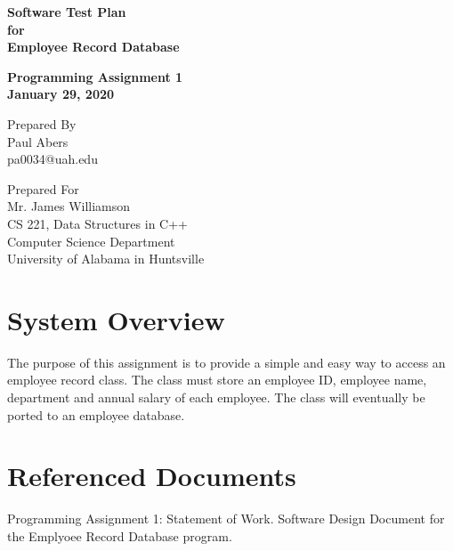 \documentclass[12pt]{article}%
\begin{document}
\begin{titlepage}
	\clearpage\thispagestyle{empty}
	\centering
	\vspace{2cm}

	{\Huge \textbf{Software Test Plan \\
        for \\
        Employee Record Database}} \\
	\vspace{1cm}
	{\large \textbf{Programming Assignment 1 \\
      January 29, 2020} \par}
	\vspace{4cm}
	{\normalsize Prepared By \\ %
      Paul Abers \\
      pa0034@uah.edu \par}
	\vspace{2cm}

    \vspace{2cm}

	{\normalsize Prepared For \\
		Mr. James Williamson \\
		CS 221, Data Structures in C++ \\
        Computer Science Department \\
        University of Alabama in Huntsville \par}

      \vspace{2cm}

	\pagebreak

\end{titlepage}

\tableofcontents

\section{System Overview}
The purpose of this assignment is to provide a simple and easy way
to access an employee record class. The class must store an employee ID,
employee name, department and annual salary of each employee. The class
will eventually be ported to an employee database.

\section{Referenced Documents}
Programming Assignment 1: Statement of Work.
Software Design Document for the Emplyoee Record Database program.
\end{document}
